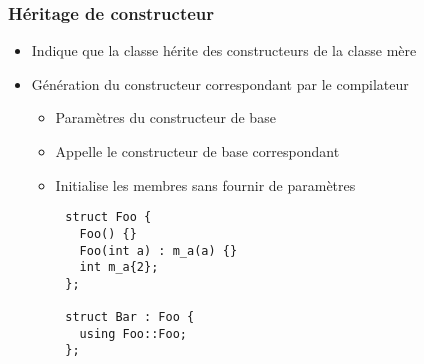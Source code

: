 \documentclass[C++.tex]{subfiles}
\begin{document}
\begin{frame}[fragile]
	\frametitle{Héritage de constructeur}
	\begin{itemize}
		\item Indique que la classe hérite des constructeurs de la classe mère
		\item Génération du constructeur correspondant par le compilateur
		\begin{itemize}
			\item Paramètres du constructeur de base
			\item Appelle le constructeur de base correspondant
			\item Initialise les membres sans fournir de paramètres

		\end{itemize}
	\end{itemize}

	\begin{verbatim}
		struct Foo {
		  Foo() {}
		  Foo(int a) : m_a(a) {}
		  int m_a{2};
		};

		struct Bar : Foo {
		  using Foo::Foo;
		};
	\end{verbatim}
\end{frame}
\end{document}
